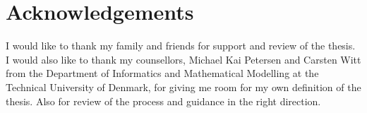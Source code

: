 \chapter{Acknowledgements}

I would like to thank my family and friends for support and review of the thesis. I would also like to thank my counsellors, Michael Kai Petersen and Carsten Witt from the Department of Informatics and Mathematical Modelling at the Technical University of Denmark, for giving me room for my own definition of the thesis. Also for review of the process and guidance in the right direction.
